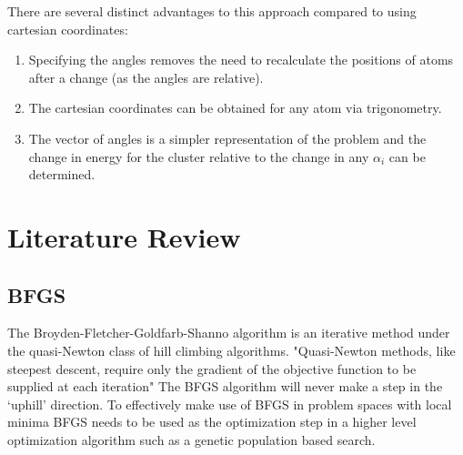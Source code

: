 \documentclass[11pt]{article}
\begin{document}
    There are several distinct advantages to this approach compared to using cartesian coordinates:
    \begin{enumerate}
        \item Specifying the angles removes the need to recalculate the positions of atoms after a change (as the angles are relative).
        \item The cartesian coordinates can be obtained for any atom via trigonometry.
        \item The vector of angles is a simpler representation of the problem and the change in energy for the cluster relative to the change in any $\alpha_{i}$ can be determined.
    \end{enumerate}

    
    \clearpage
    \section{Literature Review}
    \subsection{BFGS}
    The Broyden-Fletcher-Goldfarb-Shanno algorithm is an iterative method under the quasi-Newton class of hill climbing algorithms. "Quasi-Newton methods, like steepest descent, require only the gradient of the objective function to be supplied at each iteration" \cite{numericalOptimization}
    The BFGS algorithm will never make a step in the `uphill' direction. To effectively make use of BFGS in problem spaces with local minima BFGS needs to be used as the optimization step in a higher level optimization algorithm such as a genetic population based search.
\end{document}
